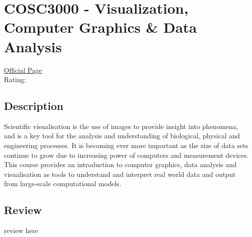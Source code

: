 \hypertarget{COSC3000}{\section{COSC3000 - Visualization, Computer Graphics \& Data Analysis}}

\large
\textcolor{turbo_purple}{\href{https://my.uq.edu.au/programs-courses/course.html?course_code=COSC3000}{Official Page}} \\
Rating: \cstar\cstar\cstar\cstar\ostar

\normalsize
\subsection*{Description}
Scientific visualisation is the use of images to provide insight into phenomena, and is a key tool for the analysis and understanding of biological, physical and engineering processes.
It is becoming ever more important as the size of data sets continue to grow due to increasing power of computers and measurement devices.
This course provides an introduction to computer graphics, data analysis and visualisation as tools to understand and interpret real world data and output from large-scale computational models.

\subsection*{Review}
review here
